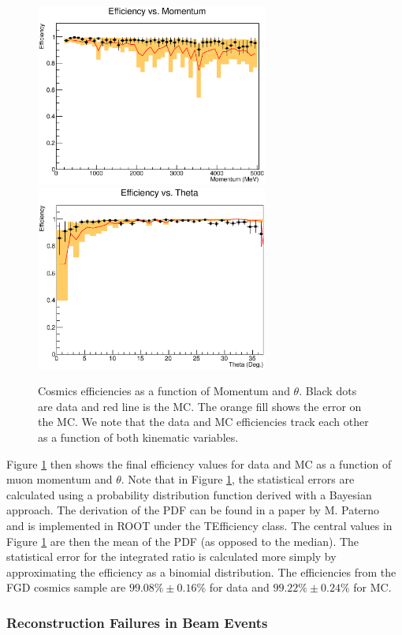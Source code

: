 \begin{figure}
\centering
\includegraphics[width=3in]{Figures/Systematics/MatchingEfficiency/Eff_vs_Momentum.eps}
\includegraphics[width=3in]{Figures/Systematics/MatchingEfficiency/Eff_vs_Theta.eps}
\caption{Cosmics efficiencies as a function of Momentum and \(\theta\). Black dots are data and red line is the MC. The orange fill shows the error on the MC. We note that the data and MC efficiencies track each other as a function of both kinematic variables.}
\label{fig:eff_ND}
\end{figure}

Figure \ref{fig:eff_ND} then shows the final efficiency values for data and MC as a function of muon momentum and $\theta$. Note that in Figure \ref{fig:eff_ND}, the statistical errors are calculated using a probability distribution function derived with a Bayesian approach. The derivation of the PDF can be found in a paper by M. Paterno~\cite{bayes} and is implemented in ROOT under the TEfficiency class. The central values in Figure \ref{fig:eff_ND} are then the mean of the PDF (as opposed to the median). The statistical error for the integrated ratio is calculated more simply by approximating the efficiency as a binomial distribution. The efficiencies from the FGD cosmics sample are $99.08\%\pm 0.16\%$ for data and $99.22\%\pm 0.24\%$ for MC.

\subsubsection{Reconstruction Failures in Beam Events}


